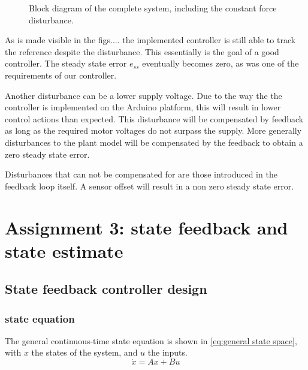 \documentclass[a4paper]{article}
\newcommand{\newpar}{\vspace{.3cm}\noindent}
\begin{document}
\begin{figure}[H]
    \caption{Block diagram of the complete system, including the constant force disturbance.}
    \label{fig:disturbance_BlockDiagram}
\end{figure}



\newpar
As is made visible in the figs.... the implemented controller is still able to track the reference despite the disturbance. This essentially is the goal of a good controller. The steady state error $e_{ss}$ eventually becomes zero, as was one of the requirements of our controller.

\newpar
Another disturbance can be a lower supply voltage. Due to the way the the controller is implemented on the Arduino platform, this will result in lower control actions than expected. This disturbance will be compensated by feedback as long as the required motor voltages do not surpass the supply. More generally disturbances to the plant model will be compensated by the feedback to obtain a zero steady state error.

\newpar
Disturbances that can not be compensated for are those introduced in the feedback loop itself. A sensor offset will result in a non zero steady state error.



\section{Assignment 3: state feedback and state estimate}
\subsection{State feedback controller design}
\subsubsection{state equation}

The general continuous-time state equation is shown in \autoref{eq:general state space}, with $x$ the states of the system, and $u$ the inputs.
    \begin{equation}
        \dot{x} = Ax + Bu
        \label{eq:general state space}
    \end{equation}
\end{document}
